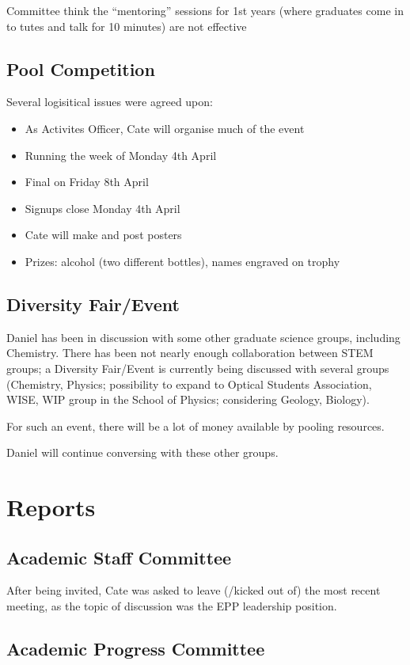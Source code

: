 \documentclass[a4paper,11pt]{article}
\begin{document}
Committee think the ``mentoring'' sessions for 1st years  (where graduates come in to tutes and talk for 10 minutes) are not effective

\subsection{Pool Competition}
Several logisitical issues were agreed upon:
\begin{itemize}
\item As Activites Officer, Cate will organise much of the event
\item Running the week of Monday 4th April
\item Final on Friday 8th April
\item Signups close Monday 4th April
\item Cate will make and post posters
\item Prizes: alcohol (two different bottles), names engraved on trophy
\end{itemize}


\subsection{Diversity Fair/Event}
Daniel has been in discussion with some other graduate science groups, including Chemistry. There has been not nearly enough collaboration between STEM groups; a Diversity Fair/Event is currently being discussed with several groups (Chemistry, Physics; possibility to expand to Optical Students Association, WISE, WIP group in the School of Physics; considering Geology, Biology). 

For such an event, there will be a lot of money available by pooling resources.

Daniel will continue conversing with these other groups.

\section{Reports}
\subsection{Academic Staff Committee}
After being invited, Cate was asked to leave (/kicked out of) the most recent meeting, as the topic of discussion was the EPP leadership position.

\subsection{Academic Progress Committee}
\end{document}
